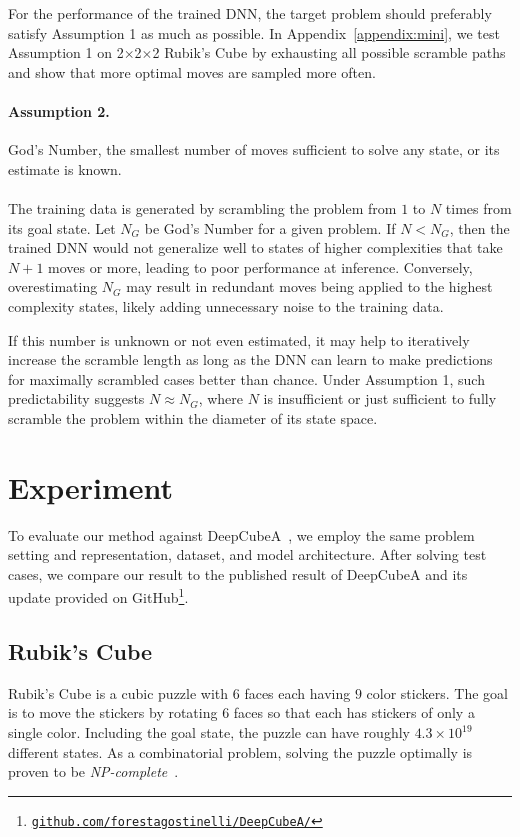 \documentclass[nohyperref]{article}
\theoremstyle{plain}
\theoremstyle{definition}
\theoremstyle{remark}
\newcommand\rurl[1]{\href{http://#1}{\nolinkurl{#1}}}
\begin{document}
For the performance of the trained DNN, the target problem should preferably satisfy Assumption 1 as much as possible.
In Appendix~\ref{appendix:mini}, we test Assumption 1 on 2$\times$2$\times$2 Rubik's Cube by exhausting all possible scramble paths and show that more optimal moves are sampled more often.

\paragraph{Assumption 2.}
God's Number, the smallest number of moves sufficient to solve any state, or its estimate is known.\\
\\
The training data is generated by scrambling the problem from $1$ to $N$ times from its goal state.
Let $N_{G}$ be God's Number for a given problem.
If $N < N_{G}$, then the trained DNN would not generalize well to states of higher complexities that take $N+1$ moves or more, leading to poor performance at inference.
Conversely, overestimating $N_{G}$ may result in redundant moves being applied to the highest complexity states, likely adding unnecessary noise to the training data.

If this number is unknown or not even estimated, it may help to iteratively increase the scramble length as long as the DNN can learn to make predictions for maximally scrambled cases better than chance.
Under Assumption 1, such predictability suggests $N \approx N_{G}$, where $N$ is insufficient or just sufficient to fully scramble the problem within the diameter of its state space.

\vspace{-0.4em}
\section{Experiment}\label{sec:experiment}
To evaluate our method against DeepCubeA~\citep{agostinelli2019solving}, we employ the same problem setting and representation, dataset, and model architecture. After solving test cases, we compare our result to the published result of DeepCubeA and its update provided on GitHub\footnote{\rurl{github.com/forestagostinelli/DeepCubeA/}}.

\vspace{-0.1em}
\subsection{Rubik's Cube}
Rubik's Cube is a cubic puzzle with $6$ faces each having $9$ color stickers.
The goal is to move the stickers by rotating $6$ faces so that each has stickers of only a single color.
Including the goal state, the puzzle can have roughly $4.3\times 10^{19}$ different states.
As a combinatorial problem, solving the puzzle optimally is proven to be \textit{NP-complete}~\citep{demaine2018solving}.
\end{document}

